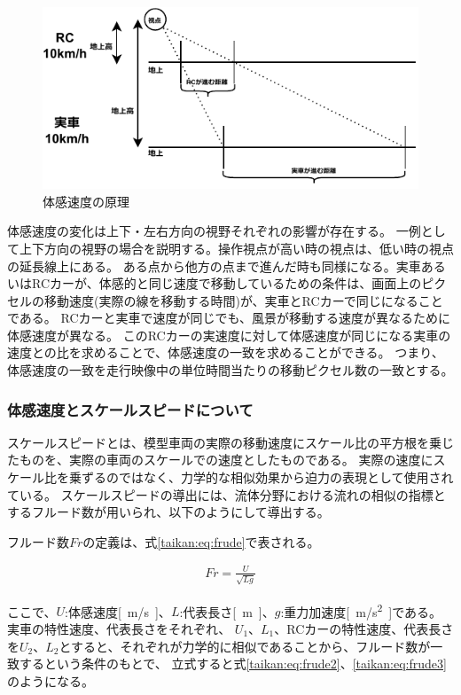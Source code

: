 \begin{figure}[h]
  \begin{center}
  \includegraphics[width=.95\linewidth]{img/2.pdf}
  \caption{体感速度の原理}
  \label{taikan:genri}
  \end{center}
\end{figure}

体感速度の変化は上下・左右方向の視野それぞれの影響が存在する。
一例として上下方向の視野の場合を説明する。操作視点が高い時の視点は、低い時の視点の延長線上にある。
ある点から他方の点まで進んだ時も同様になる。実車あるいはRCカーが、体感的と同じ速度で移動しているための条件は、画面上のピクセルの移動速度(実際の線を移動する時間)が、実車とRCカーで同じになることである。
RCカーと実車で速度が同じでも、風景が移動する速度が異なるために体感速度が異なる。
このRCカーの実速度に対して体感速度が同じになる実車の速度との比を求めることで、体感速度の一致を求めることができる。
つまり、体感速度の一致を走行映像中の単位時間当たりの移動ピクセル数の一致とする。

\subsubsection{体感速度とスケールスピードについて}
スケールスピードとは、模型車両の実際の移動速度にスケール比の平方根を乗じたものを、実際の車両のスケールでの速度としたものである。
実際の速度にスケール比を乗ずるのではなく、力学的な相似効果から迫力の表現として使用されている。
スケールスピードの導出には、流体分野における流れの相似の指標とするフルード数が用いられ、以下のようにして導出する。

フルード数$Fr$の定義は、式\eqref{taikan:eq:frude}で表される。

\begin{align}
  Fr = \frac{U}{\sqrt{Lg}} \label{taikan:eq:frude}
\end{align}

ここで、$U$:体感速度\si{[m/s]}、$L$:代表長さ\si{[m]}、$g$:重力加速度\si{[m/s^2]}である。実車の特性速度、代表長さをそれぞれ、
$U_1$、$L_1$、RCカーの特性速度、代表長さを$U_2$、$L_2$とすると、それぞれが力学的に相似であることから、フルード数が一致するという条件のもとで、
立式すると式\eqref{taikan:eq:frude2}、\eqref{taikan:eq:frude3}のようになる。


